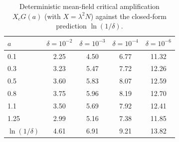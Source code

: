 \begin{table}[h]
\centering\small
\caption{Deterministic mean-field critical amplification $X_cG(a)$ (with $X=\lambda^2N$) against the closed-form prediction $\ln(1/\delta)$.}
\label{tab:mf}
\begin{tabular}{lcccc}
\toprule
$a$ & $\delta=10^{-2}$ & $\delta=10^{-3}$ & $\delta=10^{-4}$ & $\delta=10^{-6}$ \\
\midrule
0.1 & 2.25 & 4.50 & 6.77 & 11.32 \\
0.3 & 3.23 & 5.47 & 7.72 & 12.26 \\
0.5 & 3.60 & 5.83 & 8.07 & 12.59 \\
0.8 & 3.75 & 5.96 & 8.19 & 12.70 \\
1.1 & 3.50 & 5.69 & 7.92 & 12.41 \\
1.25 & 2.99 & 5.16 & 7.38 & 11.85 \\
\midrule
$\ln(1/\delta)$ & 4.61 & 6.91 & 9.21 & 13.82 \\
\bottomrule
\end{tabular}
\end{table}
